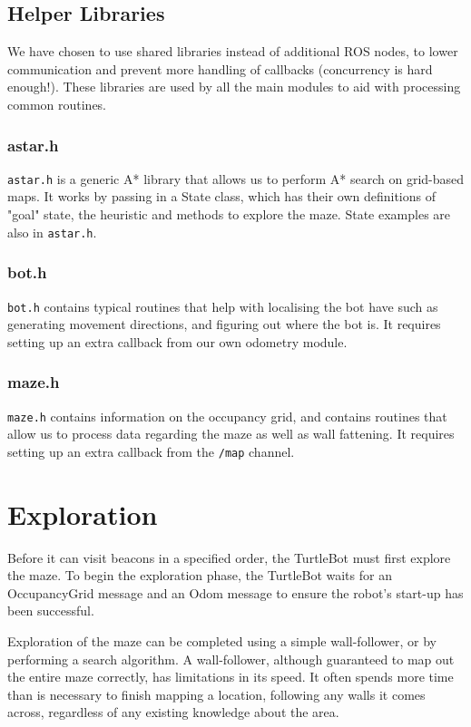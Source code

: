 \documentclass[titlepage,12pt,a4paper]{article}
\begin{document}
\subsection{Helper Libraries}
We have chosen to use shared libraries instead of additional ROS nodes, to lower communication and prevent more handling of callbacks (concurrency is hard enough!). These libraries are used by all the main modules to aid with processing common routines.

\subsubsection{astar.h}
\verb|astar.h| is a generic A* library that allows us to perform A* search on grid-based maps. It works by passing in a State class, which has their own definitions of "goal" state, the heuristic and methods to explore the maze. State examples are also in \verb|astar.h|.

\subsubsection{bot.h}
\verb|bot.h| contains typical routines that help with localising the bot have such as generating movement directions, and figuring out where the bot is. It requires setting up an extra callback from our own odometry module.

\subsubsection{maze.h}
\verb|maze.h| contains information on the occupancy grid, and contains routines that allow us to process data regarding the maze as well as wall fattening. It requires setting up an extra callback from the \verb|/map| channel.

\pagebreak
\section{Exploration}

Before it can visit beacons in a specified order, the TurtleBot must first explore the maze. To begin the exploration phase, the TurtleBot waits for an OccupancyGrid message and an Odom message to ensure the robot's start-up has been successful. 

Exploration of the maze can be completed using a simple wall-follower, or by performing a search algorithm. A wall-follower, although guaranteed to map out the entire maze correctly, has limitations in its speed. It often spends more time than is necessary to finish mapping a location, following any walls it comes across, regardless of any existing knowledge about the area.
\end{document}
